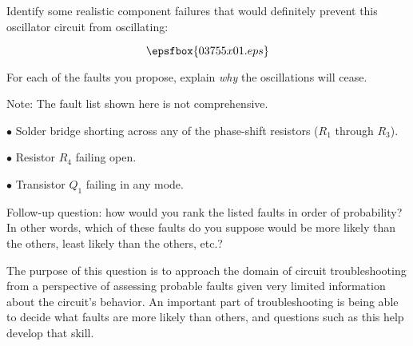 

Identify some realistic component failures that would definitely prevent this oscillator circuit from oscillating:

$$\epsfbox{03755x01.eps}$$

For each of the faults you propose, explain {\it why} the oscillations will cease.







Note: The fault list shown here is not comprehensive.

\medskip
\item{$\bullet$} Solder bridge shorting across any of the phase-shift resistors ($R_1$ through $R_3$).
\item{$\bullet$} Resistor $R_4$ failing open.
\item{$\bullet$} Transistor $Q_1$ failing in any mode.
\medskip

\vskip 10pt

Follow-up question: how would you rank the listed faults in order of probability?  In other words, which of these faults do you suppose would be more likely than the others, least likely than the others, etc.?







The purpose of this question is to approach the domain of circuit troubleshooting from a perspective of assessing probable faults given very limited information about the circuit's behavior.  An important part of troubleshooting is being able to decide what faults are more likely than others, and questions such as this help develop that skill.




